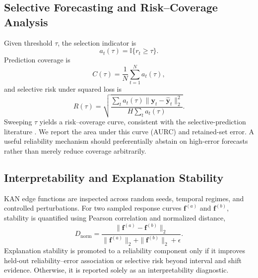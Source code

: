 \subsection{Selective Forecasting and Risk--Coverage Analysis}
Given threshold $\tau$, the selection indicator is
\begin{equation}
a_t(\tau)=\mathbb{I}\{r_t\geq\tau\}.
\end{equation}
Prediction coverage is
\begin{equation}
C(\tau)=\frac{1}{N}\sum_{t=1}^{N}a_t(\tau),
\end{equation}
and selective risk under squared loss is
\begin{equation}
R(\tau)=\sqrt{\frac{\sum_t a_t(\tau)\|\mathbf{y}_t-\hat{\mathbf{y}}_t\|_2^2}{H\sum_t a_t(\tau)}}.
\end{equation}
Sweeping $\tau$ yields a risk--coverage curve, consistent with the selective-prediction literature \cite{geifman2017selective,geifman2019selectivenet}. We report the area under this curve (AURC) and retained-set error. A useful reliability mechanism should preferentially abstain on high-error forecasts rather than merely reduce coverage arbitrarily.

\subsection{Interpretability and Explanation Stability}
KAN edge functions are inspected across random seeds, temporal regimes, and controlled perturbations. For two sampled response curves $\mathbf{f}^{(a)}$ and $\mathbf{f}^{(b)}$, stability is quantified using Pearson correlation and normalized distance,
\begin{equation}
D_{\mathrm{norm}}=\frac{\|\mathbf{f}^{(a)}-\mathbf{f}^{(b)}\|_2}{\|\mathbf{f}^{(a)}\|_2+\|\mathbf{f}^{(b)}\|_2+\epsilon}.
\end{equation}
Explanation stability is promoted to a reliability component only if it improves held-out reliability--error association or selective risk beyond interval and shift evidence. Otherwise, it is reported solely as an interpretability diagnostic.
